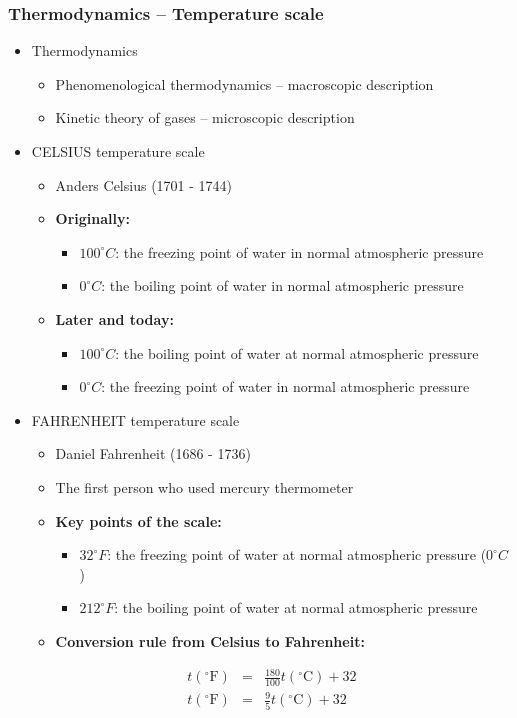 \documentclass[t,aspectratio=169]{beamer}
\begin{document}
\begin{frame}
\frametitle{Thermodynamics -- Temperature scale}
\begin{itemize}
\item Thermodynamics
\begin{itemize}
    \item Phenomenological thermodynamics – macroscopic description
    \item Kinetic theory of gases – microscopic description
\end{itemize}

\bigskip
\item CELSIUS temperature scale
\begin{itemize}
    \item Anders Celsius (1701 - 1744)
    \item \textbf{Originally:}
    \begin{itemize}
        \item $100^{\circ}C$: the freezing point of water in normal atmospheric pressure
        \item $0^{\circ}C$: the boiling point of water in normal atmospheric pressure
    \end{itemize}
    \item \textbf{Later and today:}
    \begin{itemize}
        \item $100^{\circ}C$: the boiling point of water at normal atmospheric pressure
        \item $0^{\circ}C$: the freezing point of water in normal atmospheric pressure
    \end{itemize}
\end{itemize}

\pagebreak
\item FAHRENHEIT temperature scale
\begin{itemize}
    \item Daniel Fahrenheit (1686 - 1736)
    \item The first person who used mercury thermometer
    \item \textbf{Key points of the scale:}
    \begin{itemize}
        \item $32^{\circ}F$: the freezing point of water at normal atmospheric pressure ($0^{\circ}C$)
        \item $212^{\circ}F$: the boiling point of water at normal atmospheric pressure
    \end{itemize}
    \item \textbf{Conversion rule from Celsius to Fahrenheit:}
\end{itemize}
\begin{eqnarray*}
t(^\circ\text{F}) & = & \frac{180}{100} t(^\circ\text{C}) + 32 \\
t(^\circ\text{F}) & = & \frac{9}{5} t(^\circ\text{C}) + 32
\end{eqnarray*}


\end{itemize}
\end{frame}
\end{document}
